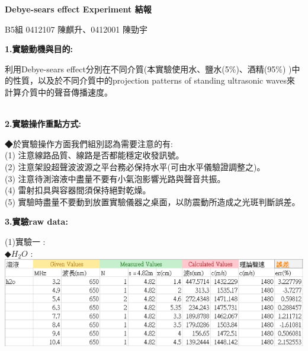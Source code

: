 \documentclass[UTF8]{ctexart}
\begin{document}
\begin{CJK*}{UTF8}{song}
\setlength{\baselineskip}{20pt} %

\begin{center}
\begin{LARGE} 
\textbf{Debye-sears effect Experiment 結報} \\
\end{LARGE}
\begin{large} 
B5組 0412107 陳麒升、0412001 陳勁宇  
\end{large}
\end{center}

\begin{large}
\textbf{1.實驗動機與目的:} \\
\end{large}
利用Debye-sears effect分別在不同介質(本實驗使用水、鹽水(5\%)、酒精(95\%) )中的性質，以及於不同介質中的projection patterns of standing ultrasonic waves來計算介質中的聲音傳播速度。 \\
 \\
%
\begin{large}
\textbf{2.實驗操作重點方式:} \\
\end{large}
◆於實驗操作方面我們組別認為需要注意的有: \\
(1) 注意線路品質、線路是否都能穩定收發訊號。 \\
(2) 注意架設超聲波波源之平台務必保持水平(可由水平儀驗證調整之)。 \\
(3) 注意待測溶液中盡量不要有小氣泡影響光路與聲音共振。 \\
(4) 雷射扣具與容器間須保持絕對乾燥。 \\
(5) 實驗時盡量不要動到放置實驗儀器之桌面，以防震動所造成之光斑判斷誤差。 \\

%


\begin{large}
\textbf{3.實驗raw data:} \\
\end{large} 
(1)實驗一 : \\
◆$H_{2}O$ : \\
\includegraphics[width = 1.0\textwidth]{EXP1_H2O.png} \\


\end{CJK*}
\end{document}
